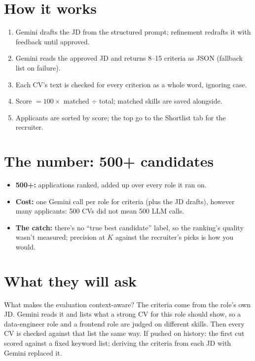 \section{How it works}
\begin{enumerate}
  \item Gemini drafts the JD from the structured prompt; refinement redrafts it with feedback until approved.
  \item Gemini reads the approved JD and returns 8--15 criteria as JSON (fallback list on failure).
  \item Each CV's text is checked for every criterion as a whole word, ignoring case.
  \item Score $= 100 \times$ matched $\div$ total; matched skills are saved alongside.
  \item Applicants are sorted by score; the top go to the Shortlist tab for the recruiter.
\end{enumerate}

\section{The number: 500+ candidates}

\begin{measured}
\begin{itemize}
  \item \textbf{500+:} applications ranked, added up over every role it ran on.
  \item \textbf{Cost:} one Gemini call per role for criteria (plus the JD drafts), however many applicants: 500 CVs did not mean 500 LLM calls.
  \item \textbf{The catch:} there's no ``true best candidate'' label, so the ranking's quality wasn't measured; precision at $K$ against the recruiter's picks is how you would.
\end{itemize}
\end{measured}

\section{What they will ask}

\begin{iq}[\core]{What makes the evaluation context-aware?}
The criteria come from the role's own JD. Gemini reads it and lists what a strong CV for this role should show, so a data-engineer role and a frontend role are judged on different skills. Then every CV is checked against that list the same way.
\deeper If pushed on history: the first cut scored against a fixed keyword list; deriving the criteria from each JD with Gemini replaced it.
\end{iq}

